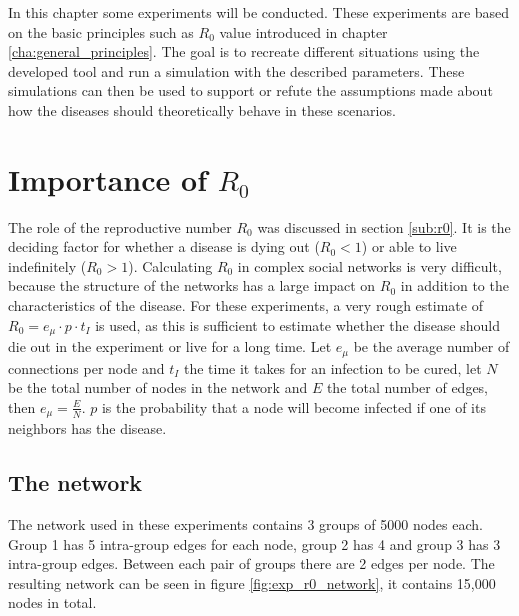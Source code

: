 In this chapter some experiments will be conducted. These experiments are based on the basic principles such as $R_0$ value introduced in chapter \ref{cha:general_principles}. The goal is to recreate different situations using the developed tool and run a simulation with the described parameters. These simulations can then be used to support or refute the assumptions made about how the diseases should theoretically behave in these scenarios.

\section{Importance of $R_0$}
The role of the reproductive number $R_0$ was discussed in section \ref{sub:r0}. It is the deciding factor for whether a disease is dying out ($R_0 < 1$) or able to live indefinitely ($R_0 > 1$). Calculating $R_0$ in complex social networks is very difficult, because the structure of the networks has a large impact on $R_0$ in addition to the characteristics of the disease. For these experiments, a very rough estimate of $R_0=e_\mu \cdot p \cdot t_I$ is used, as this is sufficient to estimate whether the disease should die out in the experiment or live for a long time. Let $e_\mu$ be the average number of connections per node and $t_I$ the time it takes for an infection to be cured, let $N$ be the total number of nodes in the network and $E$ the total number of edges, then $e_\mu=\frac{E}{N}$. $p$ is the probability that a node will become infected if one of its neighbors has the disease.

\subsection{The network}
\label{sub:exp_network}
The network used in these experiments contains 3 groups of 5000 nodes each. Group 1 has 5 intra-group edges for each node, group 2 has 4 and group 3 has 3 intra-group edges. Between each pair of groups there are 2 edges per node. The resulting network can be seen in figure \ref{fig:exp_r0_network}, it contains 15,000 nodes in total.


